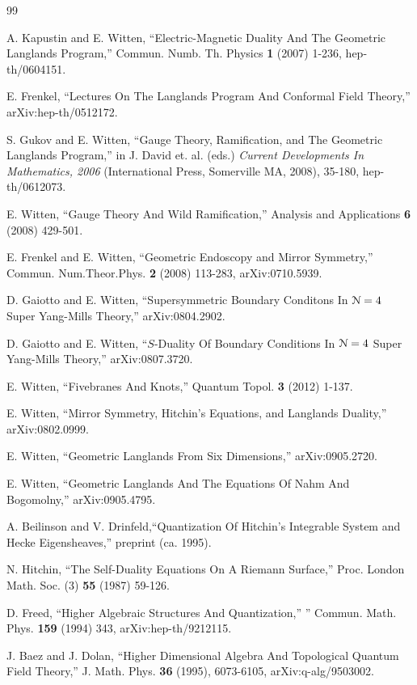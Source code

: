 
\begin{thebibliography}{99}

A. Kapustin and E. Witten, ``Electric-Magnetic Duality And The Geometric Langlands Program,'' Commun. Numb. Th. Physics {\bf 1} (2007) 1-236,
hep-th/0604151.

E. Frenkel, ``Lectures On The Langlands Program And Conformal Field Theory,'' arXiv:hep-th/0512172.

S. Gukov and E. Witten, ``Gauge Theory, Ramification, and The Geometric Langlands Program,'' in J. David et. al. (eds.) {\it Current Developments
In Mathematics, 2006} (International Press, Somerville MA, 2008), 35-180, hep-th/0612073.

E. Witten,  ``Gauge Theory And Wild Ramification,'' Analysis and Applications {\bf 6} (2008) 429-501.

E. Frenkel and E. Witten, ``Geometric Endoscopy and Mirror Symmetry,''  Commun. Num.Theor.Phys. {\bf 2} (2008) 113-283,  arXiv:0710.5939.

D. Gaiotto and E. Witten, ``Supersymmetric Boundary Conditons In ${\cal N}=4$ Super Yang-Mills Theory,''
arXiv:0804.2902.

D. Gaiotto and E. Witten, ``$S$-Duality Of Boundary Conditions In ${\cal N}=4$ Super Yang-Mills Theory,'' arXiv:0807.3720.

E. Witten, ``Fivebranes And Knots,'' Quantum Topol. {\bf 3} (2012) 1-137.

E. Witten, ``Mirror Symmetry, Hitchin's Equations, and Langlands Duality,'' arXiv:0802.0999.

E. Witten, ``Geometric Langlands From Six Dimensions,'' arXiv:0905.2720.

E. Witten, ``Geometric Langlands And The Equations Of Nahm And Bogomolny,''
arXiv:0905.4795.

A. Beilinson and V. Drinfeld,``Quantization Of Hitchin's Integrable System and Hecke Eigensheaves,'' preprint (ca. 1995).

N. Hitchin, ``The Self-Duality Equations On A Riemann Surface,''
Proc. London Math. Soc. (3) {\bf 55} (1987) 59-126.

D. Freed, ``Higher Algebraic Structures And Quantization,'' ” Commun. Math. Phys. {\bf 159}
(1994) 343, arXiv:hep-th/9212115.

 J. Baez and J. Dolan, “Higher Dimensional Algebra And Topological Quantum Field Theory,”
J. Math. Phys. {\bf  36} (1995), 6073-6105, arXiv:q-alg/9503002.


\end{thebibliography}
